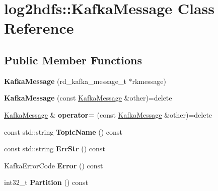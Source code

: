 \hypertarget{classlog2hdfs_1_1KafkaMessage}{}\section{log2hdfs\+:\+:Kafka\+Message Class Reference}
\label{classlog2hdfs_1_1KafkaMessage}
\subsection*{Public Member Functions}
\begin{DoxyCompactItemize}
\item 
{\bfseries Kafka\+Message} (rd\+\_\+kafka\+\_\+message\+\_\+t $\ast$rkmessage)\hypertarget{classlog2hdfs_1_1KafkaMessage_a95c76a221b2330e00fb5a73b13c72513}{}\label{classlog2hdfs_1_1KafkaMessage_a95c76a221b2330e00fb5a73b13c72513}

\item 
{\bfseries Kafka\+Message} (const \hyperlink{classlog2hdfs_1_1KafkaMessage}{Kafka\+Message} \&other)=delete\hypertarget{classlog2hdfs_1_1KafkaMessage_a3e7b1c6a99886ae61b168375b2a19fe2}{}\label{classlog2hdfs_1_1KafkaMessage_a3e7b1c6a99886ae61b168375b2a19fe2}

\item 
\hyperlink{classlog2hdfs_1_1KafkaMessage}{Kafka\+Message} \& {\bfseries operator=} (const \hyperlink{classlog2hdfs_1_1KafkaMessage}{Kafka\+Message} \&other)=delete\hypertarget{classlog2hdfs_1_1KafkaMessage_aaf8509f9e0f9003e433f35d4d518ae38}{}\label{classlog2hdfs_1_1KafkaMessage_aaf8509f9e0f9003e433f35d4d518ae38}

\item 
const std\+::string {\bfseries Topic\+Name} () const \hypertarget{classlog2hdfs_1_1KafkaMessage_a17102357c16ebe4b787821b7fc4d6971}{}\label{classlog2hdfs_1_1KafkaMessage_a17102357c16ebe4b787821b7fc4d6971}

\item 
const std\+::string {\bfseries Err\+Str} () const \hypertarget{classlog2hdfs_1_1KafkaMessage_a38701846ac387eff0415fd9c332bceab}{}\label{classlog2hdfs_1_1KafkaMessage_a38701846ac387eff0415fd9c332bceab}

\item 
Kafka\+Error\+Code {\bfseries Error} () const \hypertarget{classlog2hdfs_1_1KafkaMessage_a9d6c5c98c8b42e46bf279dfd9034fcd4}{}\label{classlog2hdfs_1_1KafkaMessage_a9d6c5c98c8b42e46bf279dfd9034fcd4}

\item 
int32\+\_\+t {\bfseries Partition} () const \hypertarget{classlog2hdfs_1_1KafkaMessage_a0a491e44e604271a4298c6c1c0744afc}{}\label{classlog2hdfs_1_1KafkaMessage_a0a491e44e604271a4298c6c1c0744afc}


\end{DoxyCompactItemize}
